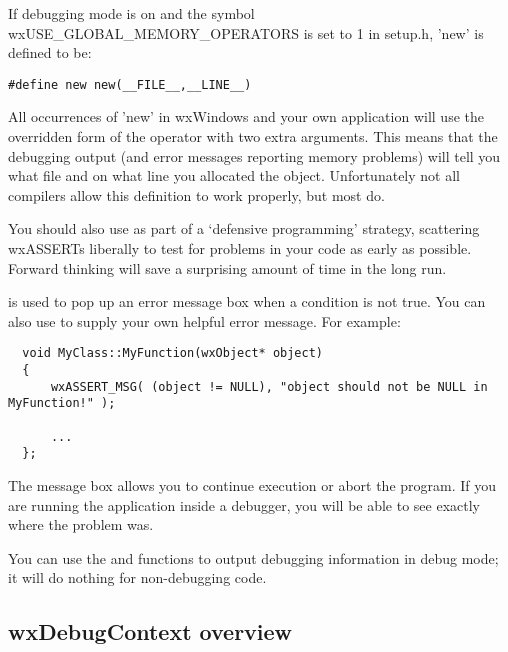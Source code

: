 If debugging mode is on and the symbol wxUSE\_GLOBAL\_MEMORY\_OPERATORS is set
to 1 in setup.h, 'new' is defined to be:

{\small
\begin{verbatim}
#define new new(__FILE__,__LINE__)
\end{verbatim}
}%

All occurrences of 'new' in wxWindows and your own application will use
the overridden form of the operator with two extra arguments. This means that the debugging
output (and error messages reporting memory problems) will tell you what
file and on what line you allocated the object. Unfortunately not all
compilers allow this definition to work properly, but most do.


You should also use  as part of a `defensive programming' strategy,
scattering wxASSERTs liberally to test for problems in your code as early as possible. Forward thinking
will save a surprising amount of time in the long run.

 is used to pop up an error message box when a condition
is not true. You can also use  to supply your
own helpful error message. For example:

{\small
\begin{verbatim}
  void MyClass::MyFunction(wxObject* object)
  {
      wxASSERT_MSG( (object != NULL), "object should not be NULL in MyFunction!" );

      ...
  };
\end{verbatim}
}

The message box allows you to continue execution or abort the program. If you are running
the application inside a debugger, you will be able to see exactly where the problem was.


You can use the  and  functions to output debugging information in debug mode;
it will do nothing for non-debugging code.

\subsection{wxDebugContext overview}\label{wxdebugcontextoverview}


